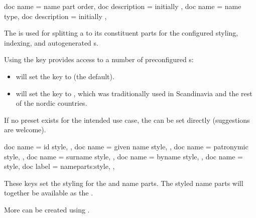 \documentclass[
	a4paper,
]{article}
\begin{document}
\begin{docKeys}
	[
		doc parameter = {=\meta{...}},
	]
	{
		{
			doc name = name part order,
			doc description = {initially }
		},
		{
			doc name = name type,
			doc description = {initially }
		},
	}

	The  is used for splitting a  to its constituent parts for the configured styling, indexing, and autogenerated s.

	Using the  key provides access to a number of preconfigured s:

	\begin{itemize}
		\item {} will set the  key to  (the default).
		\item {} will set the  key to , which was traditionally used in Scandinavia and the rest of the nordic countries.
	\end{itemize}

	If no preset  exists for the intended use case, the  can be set directly (suggestions are welcome).
\end{docKeys}

\begin{docKeys}
	[
		doc parameter = {=\meta{...}},
		doc description = {initially not set},
	]
	{
		{
			doc name = id style,
		},
		{
			doc name = given name style,
		},
		{
			doc name = patronymic style,
		},
		{
			doc name = surname style,
		},
		{
			doc name = byname style,
		},
		{
			doc name =  style,
			doc label = nameparts:style,
		},
	}

	These keys set the styling for the  and name parts. The styled name parts will together be available as the .

	More can be created using .
\end{docKeys}
\end{document}
